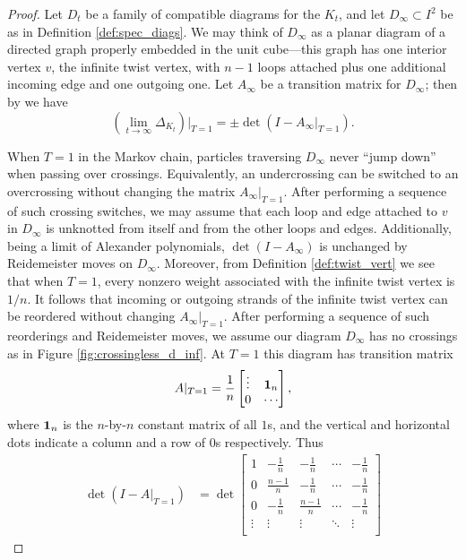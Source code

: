 \documentclass[11pt,hyp,]{nyjm}
\numberwithin{thm}{section}
\theoremstyle{definition}
\theoremstyle{remark}
\begin{document}
	\begin{proof}
		Let $D_t$ be a family of compatible diagrams for the $K_t$, and let $D_\infty \subset I^2$ be as in Definition \ref{def:spec_diags}. We may think of $D_\infty$ as a planar diagram of a directed graph properly embedded in the unit cube---this graph has one interior vertex $v$, the infinite twist vertex, with $n - 1$ loops attached plus one additional incoming edge and one outgoing one. Let $A_\infty$ be a transition matrix for $D_\infty$; then by  we have
		$$
		(\lim_{t \to \infty} \Delta_{K_t})|_{T = 1} = \pm\det(I - A_\infty|_{T = 1}).
		$$
		
		When $T = 1$ in the Markov chain, particles traversing $D_\infty$ never ``jump down'' when passing over crossings. Equivalently, an undercrossing can be switched to an overcrossing without changing the matrix $A_\infty|_{T = 1}$. After performing a sequence of such crossing switches, we may assume that each loop and edge attached to $v$ in $D_\infty$ is unknotted from itself and from the other loops and edges. Additionally, being a limit of Alexander polynomials, $\det(I - A_\infty)$ is unchanged by Reidemeister moves on $D_\infty$. Moreover, from Definition \ref{def:twist_vert} we see that when $T = 1$, every nonzero weight associated with the infinite twist vertex is $1/n$. It follows that incoming or outgoing strands of the infinite twist vertex can be reordered without changing $A_\infty|_{T = 1}$. After performing a sequence of such reorderings and Reidemeister moves, we assume our diagram $D_\infty$ has no crossings as in Figure \ref{fig:crossingless_d_inf}. At $T = 1$ this diagram has transition matrix
		$$
		A|_{T = 1} = \frac{1}{n} \begin{bmatrix}
			\vdots & {\bf 1}_n \\
			0 & \cdots \\
		\end{bmatrix},
		$$
		where ${\bf 1}_n$ is the $n$-by-$n$ constant matrix of all $1$s, and the vertical and horizontal dots indicate a column and a row of $0$s respectively. Thus
		\begin{align*}
		\det (I - A|_{T = 1}) &= \det \begin{bmatrix}
			1 & -\frac{1}{n} & -\frac{1}{n} & \cdots & -\frac{1}{n} \\
			0 & \frac{n - 1}{n} & -\frac{1}{n} & \cdots & -\frac{1}{n} \\
			0 & -\frac{1}{n} & \frac{n - 1}{n} & \cdots & -\frac{1}{n} \\
			\vdots & \vdots & \vdots & \ddots & \vdots \\

\end{bmatrix}
\end{align*}
\end{proof}
\end{document}
